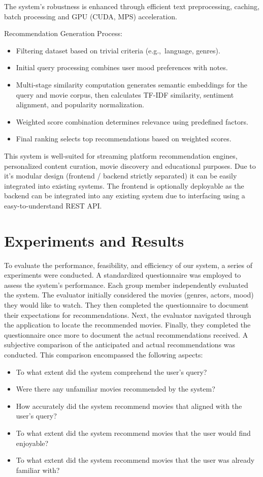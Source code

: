 \documentclass[12pt,a4paper]{article}
\begin{document}
  \noindent The system’s robustness is enhanced through efficient text preprocessing, caching, batch processing and
  GPU (CUDA, MPS) acceleration.

  \noindent Recommendation Generation Process:
  \begin{itemize}
    \item Filtering dataset based on trivial criteria (e.g.,\ language, genres).
    \item Initial query processing combines user mood preferences with notes.
    \item Multi-stage similarity computation generates semantic embeddings for the query and movie corpus, then calculates TF-IDF similarity, sentiment alignment, and popularity normalization.
    \item Weighted score combination determines relevance using predefined factors.
    \item Final ranking selects top recommendations based on weighted scores.
  \end{itemize}

  \noindent This system is well-suited for streaming platform recommendation engines, personalized content curation, movie discovery
  and educational purposes.
  Due to it's modular design (frontend / backend strictly separated) it can be easily integrated into existing systems.
  The frontend is optionally deployable as the backend can be integrated into any existing system due to interfacing
  using a easy-to-understand REST API.


  \section{Experiments and Results}

  To evaluate the performance, feasibility, and efficiency of our system, a series of experiments were conducted.
  A standardized questionnaire was employed to assess the system’s performance. Each group member independently evaluated
  the system.
  The evaluator initially considered the movies (genres, actors, mood) they would like to watch. They then completed the
  questionnaire to document their expectations for recommendations.
  Next, the evaluator navigated through the application to locate the recommended movies. Finally, they completed the
  questionnaire once more to document the actual recommendations received.
  A subjective comparison of the anticipated and actual recommendations was conducted. This comparison encompassed the
  following aspects:
  \begin{itemize}
    \item To what extent did the system comprehend the user’s query?
    \item Were there any unfamiliar movies recommended by the system?
    \item How accurately did the system recommend movies that aligned with the user’s query?
    \item To what extent did the system recommend movies that the user would find enjoyable?
    \item To what extent did the system recommend movies that the user was already familiar with?
  \end{itemize}
\end{document}

